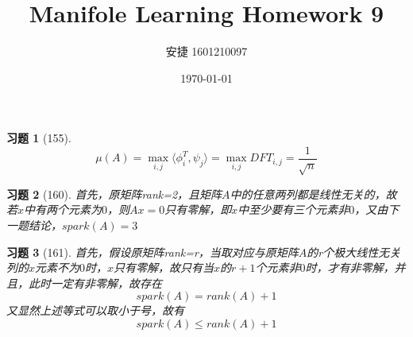 \documentclass[a4paper, UTF8]{ctexart}
\title{Manifole Learning Homework 9}
\date{\today}
\author{安捷 1601210097}
\newtheorem*{exercise}{\textbf{习题}}
\begin{document}
\maketitle
	\begin{exercise}[155]
		\begin{equation}
			\mu \left( A \right) = \max\limits_{i,j} \langle \phi_i^T, \psi_j \rangle = \max\limits_{i,j}DFT_{i,j} = \frac{1}{\sqrt{n}}
		\end{equation}
	\end{exercise}
	\begin{exercise}[160]
		首先，原矩阵rank=2，且矩阵$A$中的任意两列都是线性无关的，故若$x$中有两个元素为$0$，则$Ax = 0$只有零解，即$x$中至少要有三个元素非$0$，又由下一题结论，$spark\left(A\right)=3$
	\end{exercise}
	\begin{exercise}[161]
		首先，假设原矩阵rank=r，当取对应与原矩阵$A$的r个极大线性无关列的$x$元素不为$0$时，$x$只有零解，故只有当$x$的$r+1$个元素非$0$时，才有非零解，并且，此时一定有非零解，故存在
		\begin{equation}
			spark \left( A \right) = rank \left( A \right) + 1
		\end{equation}
		又显然上述等式可以取小于号，故有
		\begin{equation}
			spark \left( A \right) \le rank \left( A \right) + 1
		\end{equation}
	\end{exercise}
\end{document}

